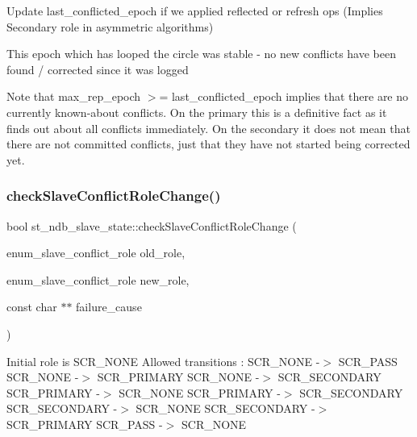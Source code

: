 Update last\+\_\+conflicted\+\_\+epoch if we applied reflected or refresh ops (Implies Secondary role in asymmetric algorithms)

This epoch which has looped the circle was stable -\/ no new conflicts have been found / corrected since it was logged

Note that max\+\_\+rep\+\_\+epoch $>$= last\+\_\+conflicted\+\_\+epoch implies that there are no currently known-\/about conflicts. On the primary this is a definitive fact as it finds out about all conflicts immediately. On the secondary it does not mean that there are not committed conflicts, just that they have not started being corrected yet.\mbox{\label{structst__ndb__slave__state_a51b92c9d78e009560db169c28cf9aaf9}} 
\subsubsection{\texorpdfstring{check\+Slave\+Conflict\+Role\+Change()}{checkSlaveConflictRoleChange()}}
{\footnotesize\ttfamily bool st\+\_\+ndb\+\_\+slave\+\_\+state\+::check\+Slave\+Conflict\+Role\+Change (\begin{DoxyParamCaption}\item[{enum\+\_\+slave\+\_\+conflict\+\_\+role}]{old\+\_\+role,  }\item[{enum\+\_\+slave\+\_\+conflict\+\_\+role}]{new\+\_\+role,  }\item[{const char $\ast$$\ast$}]{failure\+\_\+cause }\end{DoxyParamCaption})\hspace{0.3cm}{\ttfamily [static]}}

Initial role is S\+C\+R\+\_\+\+N\+O\+NE Allowed transitions \+: S\+C\+R\+\_\+\+N\+O\+NE -\/$>$ S\+C\+R\+\_\+\+P\+A\+SS S\+C\+R\+\_\+\+N\+O\+NE -\/$>$ S\+C\+R\+\_\+\+P\+R\+I\+M\+A\+RY S\+C\+R\+\_\+\+N\+O\+NE -\/$>$ S\+C\+R\+\_\+\+S\+E\+C\+O\+N\+D\+A\+RY S\+C\+R\+\_\+\+P\+R\+I\+M\+A\+RY -\/$>$ S\+C\+R\+\_\+\+N\+O\+NE S\+C\+R\+\_\+\+P\+R\+I\+M\+A\+RY -\/$>$ S\+C\+R\+\_\+\+S\+E\+C\+O\+N\+D\+A\+RY S\+C\+R\+\_\+\+S\+E\+C\+O\+N\+D\+A\+RY -\/$>$ S\+C\+R\+\_\+\+N\+O\+NE S\+C\+R\+\_\+\+S\+E\+C\+O\+N\+D\+A\+RY -\/$>$ S\+C\+R\+\_\+\+P\+R\+I\+M\+A\+RY S\+C\+R\+\_\+\+P\+A\+SS -\/$>$ S\+C\+R\+\_\+\+N\+O\+NE

